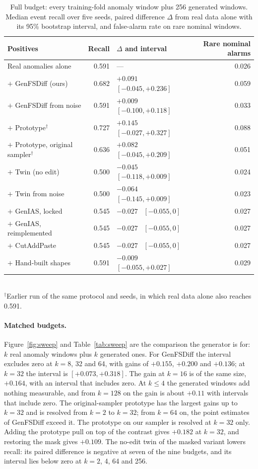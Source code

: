 \documentclass[11pt,a4paper]{article}
\begin{document}
\begin{table}[t]
\centering
\caption{Full budget: every training-fold anomaly window plus 256 generated
windows. Median event recall over five seeds, paired difference $\Delta$ from
real data alone with its 95\% bootstrap interval, and false-alarm rate on rare
nominal windows.}
\label{tab:full}
\small
\begin{tabular}{@{}lrlr@{}}
\toprule
Positives & Recall & $\Delta$ and interval & Rare nominal alarms \\
\midrule
Real anomalies alone & 0.591 & --- & 0.026 \\
\addlinespace
$+$ GenFSDiff (ours) & 0.682 & $+0.091$ \ $[-0.045, +0.236]$ & 0.059 \\
$+$ GenFSDiff from noise & 0.591 & $+0.009$ \ $[-0.100, +0.118]$ & 0.033 \\
$+$ Prototype$^{\dagger}$ & 0.727 & $+0.145$ \ $[-0.027, +0.327]$ & 0.088 \\
$+$ Prototype, original sampler$^{\dagger}$ & 0.636 & $+0.082$ \ $[-0.045, +0.209]$ & 0.051 \\
$+$ Twin (no edit) & 0.500 & $-0.045$ \ $[-0.118, +0.009]$ & 0.024 \\
$+$ Twin from noise & 0.500 & $-0.064$ \ $[-0.145, +0.009]$ & 0.023 \\
\midrule
$+$ GenIAS, locked & 0.545 & $-0.027$ \ $[-0.055, 0]$ & 0.027 \\
$+$ GenIAS, reimplemented & 0.545 & $-0.027$ \ $[-0.055, 0]$ & 0.027 \\
$+$ CutAddPaste & 0.545 & $-0.027$ \ $[-0.055, 0]$ & 0.027 \\
$+$ Hand-built shapes & 0.591 & $-0.009$ \ $[-0.055, +0.027]$ & 0.029 \\
\bottomrule
\end{tabular}\\[0.3em]
{\footnotesize $^{\dagger}$Earlier run of the same protocol and seeds, in
which real data alone also reaches 0.591.}
\end{table}

\paragraph{Matched budgets.}
Figure~\ref{fig:sweep} and Table~\ref{tab:sweep} are the comparison the
generator is for: $k$ real anomaly windows plus $k$ generated ones. For
GenFSDiff the interval excludes zero at $k = 8$, 32 and 64, with gains of
$+0.155$, $+0.200$ and $+0.136$; at $k = 32$ the interval is
$[+0.073, +0.318]$. The gain at $k = 16$ is of the same size, $+0.164$, with
an interval that includes zero. At $k \le 4$ the generated windows add nothing
measurable, and from $k = 128$ on the gain is about $+0.11$ with intervals
that include zero. The original-sampler prototype has the largest gains up to
$k = 32$ and is resolved from $k = 2$ to $k = 32$; from $k = 64$ on, the point
estimates of GenFSDiff exceed it. The prototype on our sampler is resolved at
$k = 32$ only. Adding the prototype pull on top of the contrast gives $+0.182$
at $k = 32$, and restoring the mask gives $+0.109$. The no-edit twin of the
masked variant lowers recall: its paired difference is negative at seven of
the nine budgets, and its interval lies below zero at $k = 2$, 4, 64 and 256.
\end{document}
